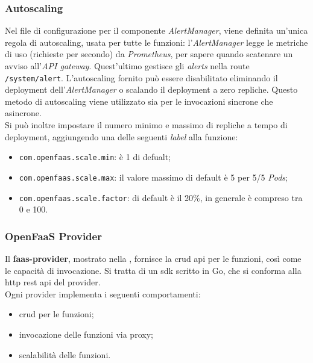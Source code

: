 \documentclass[12pt,a4paper,openany,twoside]{book}
\begin{document}
\subsubsection{Autoscaling}

Nel file di configurazione per il componente \textit{AlertManager}, viene definita un'unica regola di autoscaling, usata per tutte le funzioni: l'\textit{AlertManager} legge le metriche di uso (richieste per secondo) da \textit{Prometheus}, per sapere quando scatenare un avviso all'\textit{API gateway}. Quest'ultimo gestisce gli \textit{alerts} nella route \texttt{/system/alert}. L'autoscaling fornito può essere disabilitato eliminando il deployment  dell'\textit{AlertManager} o scalando il deployment a zero repliche. Questo metodo di autoscaling viene utilizzato sia per le invocazioni sincrone che asincrone.
\\
Si può inoltre impostare il numero minimo e massimo di repliche a tempo di deployment, aggiungendo una delle seguenti \textit{label} alla funzione:
\begin{itemize}
    \item \texttt{com.openfaas.scale.min}: è 1 di defualt;
    
    \item \texttt{com.openfaas.scale.max}: il valore massimo di default è 5 per 5/5 \textit{Pods};
    
    \item \texttt{com.openfaas.scale.factor}: di default è il 20\%, in generale è compreso tra 0 e 100.
\end{itemize}

\subsubsection{OpenFaaS Provider}

Il \textbf{faas-provider}, mostrato nella , fornisce la \ac{crud} \ac{api} per le funzioni, così come le capacità di invocazione. Si tratta di un \ac{sdk} scritto in Go, che si conforma alla \ac{http} \ac{rest} \ac{api} del provider.
\\
Ogni provider implementa i seguenti comportamenti:
\begin{itemize}
    \item \ac{crud} per le funzioni;
    
    \item invocazione delle funzioni via proxy;
    
    \item scalabilità delle funzioni.
\end{itemize}
\end{document}
